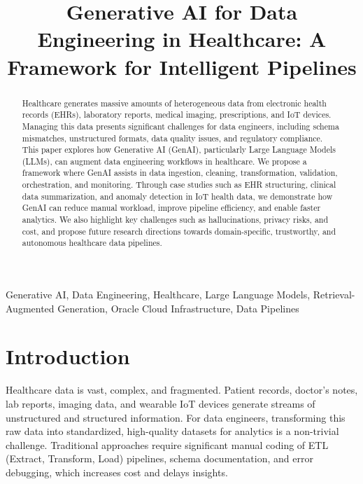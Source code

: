 \documentclass[conference]{IEEEtran}
\begin{document}
\title{Generative AI for Data Engineering in Healthcare: A Framework for Intelligent Pipelines}

\author{
}

\maketitle

\begin{abstract}
Healthcare generates massive amounts of heterogeneous data from electronic health records (EHRs), laboratory reports, medical imaging, prescriptions, and IoT devices. Managing this data presents significant challenges for data engineers, including schema mismatches, unstructured formats, data quality issues, and regulatory compliance. This paper explores how Generative AI (GenAI), particularly Large Language Models (LLMs), can augment data engineering workflows in healthcare. We propose a framework where GenAI assists in data ingestion, cleaning, transformation, validation, orchestration, and monitoring. Through case studies such as EHR structuring, clinical data summarization, and anomaly detection in IoT health data, we demonstrate how GenAI can reduce manual workload, improve pipeline efficiency, and enable faster analytics. We also highlight key challenges such as hallucinations, privacy risks, and cost, and propose future research directions towards domain-specific, trustworthy, and autonomous healthcare data pipelines.
\end{abstract}

\begin{IEEEkeywords}
Generative AI, Data Engineering, Healthcare, Large Language Models, Retrieval-Augmented Generation, Oracle Cloud Infrastructure, Data Pipelines
\end{IEEEkeywords}

\section{Introduction}
Healthcare data is vast, complex, and fragmented. Patient records, doctor's notes, lab reports, imaging data, and wearable IoT devices generate streams of unstructured and structured information. For data engineers, transforming this raw data into standardized, high-quality datasets for analytics is a non-trivial challenge. Traditional approaches require significant manual coding of ETL (Extract, Transform, Load) pipelines, schema documentation, and error debugging, which increases cost and delays insights.
\end{document}
